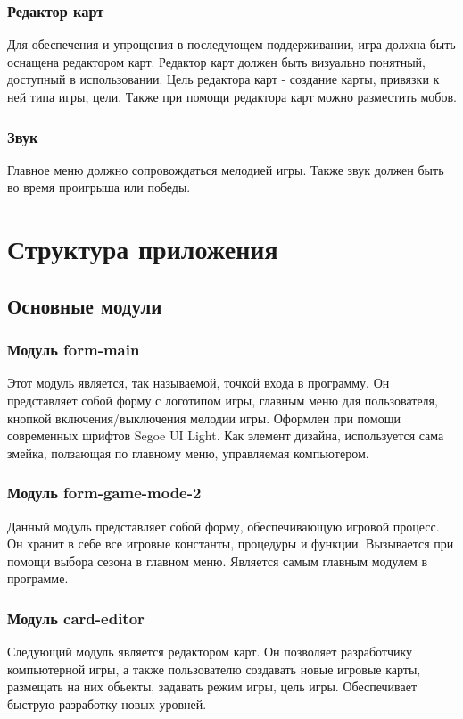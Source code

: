 \documentclass[a4paper,14pt]{extarticle}
\begin{document}
\subsubsection{Редактор карт}
Для обеспечения и упрощения в последующем поддерживании, игра должна быть оснащена редактором карт. Редактор карт должен быть визуально понятный, доступный в использовании. Цель редактора карт - создание карты, привязки к ней типа игры, цели. Также при помощи редактора карт можно разместить мобов.
\subsubsection{Звук}
Главное меню должно сопровождаться мелодией игры. Также звук должен быть во время проигрыша или победы.

\section{Структура приложения}
\subsection{Основные модули}
\subsubsection{Модуль form-main}
Этот модуль является, так называемой, точкой входа в программу. Он представляет собой форму с логотипом игры, главным меню для пользователя, кнопкой включения/выключения мелодии игры. Оформлен при помощи современных шрифтов Segoe UI Light. Как элемент дизайна, используется сама змейка, ползающая по главному меню, управляемая компьютером.
\subsubsection{Модуль form-game-mode-2}
Данный модуль представляет собой форму, обеспечивающую игровой процесс. Он хранит в себе все игровые константы, процедуры и функции. Вызывается при помощи выбора сезона в главном меню. Является самым главным модулем в программе.

\subsubsection{Модуль card-editor}
Следующий модуль является редактором карт. Он позволяет разработчику компьютерной игры, а также пользователю создавать новые игровые карты, размещать на них обьекты, задавать режим игры, цель игры. Обеспечивает быструю разработку новых уровней.
\end{document}
